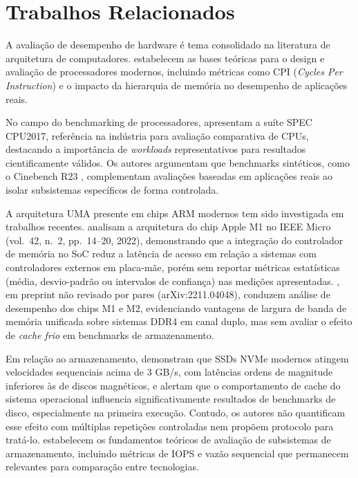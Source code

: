 \documentclass[12pt]{article}
\begin{document}
\section{Trabalhos Relacionados}

A avalia\c{c}\~ao de desempenho de hardware \'e tema consolidado na literatura
de arquitetura de computadores. \cite{hennessy2017computer} estabelecem as
bases te\'oricas para o design e avalia\c{c}\~ao de processadores modernos,
incluindo m\'etricas como CPI (\textit{Cycles Per Instruction}) e o impacto
da hierarquia de mem\'oria no desempenho de aplica\c{c}\~oes reais.

No campo do benchmarking de processadores, \cite{bucek2018spec} apresentam a
su\'ite SPEC CPU2017, refer\^encia na ind\'ustria para avalia\c{c}\~ao
comparativa de CPUs, destacando a import\^ancia de \textit{workloads}
representativos para resultados cientificamente v\'alidos. Os autores argumentam
que benchmarks sint\'eticos, como o Cinebench R23 \cite{maxon2023cinebench},
complementam avalia\c{c}\~oes baseadas em aplica\c{c}\~oes reais ao isolar
subsistemas espec\'ificos de forma controlada.

A arquitetura UMA presente em chips ARM modernos tem sido investigada em
trabalhos recentes. \cite{lim2022apple} analisam a arquitetura do chip Apple
M1 no IEEE Micro (vol.~42, n.~2, pp.~14--20, 2022), demonstrando que a
integra\c{c}\~ao do controlador de mem\'oria no SoC reduz a lat\^encia de
acesso em rela\c{c}\~ao a sistemas com controladores externos em placa-m\~ae,
por\'em sem reportar m\'etricas estat\'isticas (m\'edia, desvio-padr\~ao ou
intervalos de confian\c{c}a) nas medi\c{c}\~oes apresentadas. \cite{truong2022performance},
em preprint n\~ao revisado por pares (arXiv:2211.04048), conduzem an\'alise
de desempenho dos chips M1 e M2, evidenciando vantagens de largura de banda
de mem\'oria unificada sobre sistemas DDR4 em canal duplo, mas sem avaliar
o efeito de \textit{cache frio} em benchmarks de armazenamento.

Em rela\c{c}\~ao ao armazenamento, \cite{yang2020empirical} demonstram que
SSDs NVMe modernos atingem velocidades sequenciais acima de 3 GB/s, com
lat\^encias ordens de magnitude inferiores \`as de discos magn\'eticos, e
alertam que o comportamento de cache do sistema operacional influencia
significativamente resultados de benchmarks de disco, especialmente na
primeira execu\c{c}\~ao. Contudo, os autores n\~ao quantificam esse efeito
com m\'ultiplas repeti\c{c}\~oes controladas nem propõem protocolo para
trat\'a-lo. \cite{chen1994raid} estabelecem os fundamentos te\'oricos de
avalia\c{c}\~ao de subsistemas de armazenamento, incluindo m\'etricas de
IOPS e vaz\~ao sequencial que permanecem relevantes para compara\c{c}\~ao
entre tecnologias.
\end{document}
